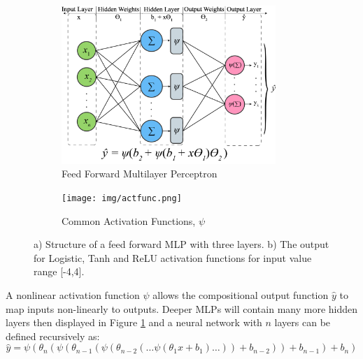 \begin{figure}[h!]
    \centering
    \begin{subfigure}[b]{0.59\textwidth}
        \includegraphics[height = 6cm, width=\textwidth]{img/mlp.png}
        \caption{Feed Forward Multilayer Perceptron}
        \label{fig:mlp}
    \end{subfigure}
    \hfill
    \begin{subfigure}[b]{0.40\textwidth}
        \texttt{[image: img/actfunc.png]}
        \caption{Common Activation Functions, $\psi$}
        \label{fig:actfunc}
    \end{subfigure}
    \caption{a) Structure of a feed forward MLP with three layers. b) The output for Logistic, Tanh and ReLU activation functions for input value range [-4,4].}\label{fig:mlp_actfunc}
\end{figure}
% 

A nonlinear activation function $\psi$ allows the compositional output function $ \hat{y}$ to map inputs non-linearly to outputs. Deeper MLPs will contain many more hidden layers then displayed in Figure \ref{fig:mlp} and a neural network with $n$ layers can be defined recursively as:
\begin{equation}
        \hat{y} = \psi(\theta_{n}(\psi(\theta_{n-1}(\psi(\theta_{n-2}(\ldots \psi(\theta_{1} x + b_{1}) \ldots)) + b_{n-2})) + b_{n-1}) + b_{n}) 
\end{equation}

